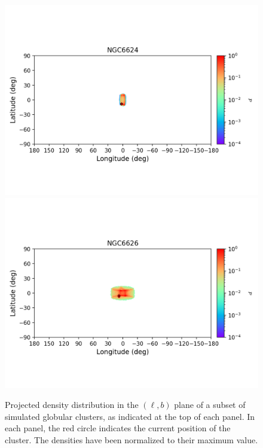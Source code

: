 \begin{figure}
\begin{center}
                \includegraphics[clip=true, trim = 0mm 20mm 0mm 10mm, width=1\columnwidth]{images/error_plots_NGC6624.png}
                \includegraphics[clip=true, trim = 0mm 20mm 0mm 10mm, width=1\columnwidth]{images/error_plots_NGC6626.png}
            \end{center}
            \caption[]{Projected density distribution in the $(\ell, b)$ plane of a subset of simulated globular clusters, as indicated at the top of each panel. In each panel, the red circle indicates the current position of the cluster. The densities have been normalized to their maximum value.}\label{stream13}
        \end{figure}
        

